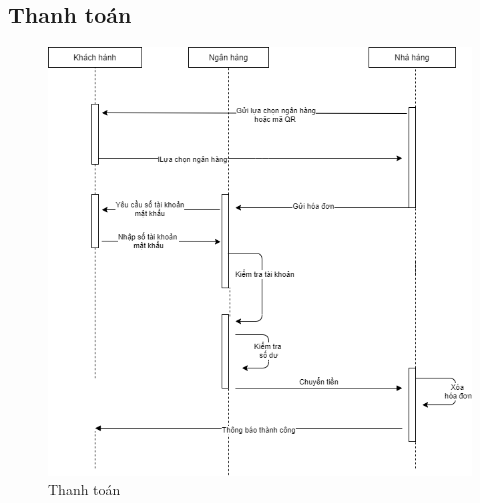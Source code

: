 \newpage
\subsection{Thanh toán}

\begin{figure}[!h]
    \begin{center}
        \includegraphics[scale=0.6]{Images/SequenceDiagram/SE_UML-SequencePayment.drawio.png}
    \end{center}
    \hspace{0.3cm}
    \caption{Thanh toán}
\end{figure}
